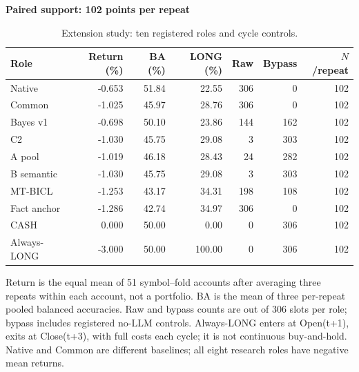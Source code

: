 \begin{table}[!htb]
\centering\small
\setlength{\tabcolsep}{3pt}
\renewcommand{\arraystretch}{1.12}
\caption{Extension study: ten registered roles and cycle controls.}
\label{tab:u09-comparison}
\textbf{Paired support: 102 points per repeat}\par\smallskip
\begin{tabular}{lrrrrrr}
\hline
Role & Return (\%) & BA (\%) & LONG (\%) & Raw & Bypass & $N$/repeat \\
\hline
Native & -0.653 & 51.84 & 22.55 & 306 & 0 & 102 \\
Common & -1.025 & 45.97 & 28.76 & 306 & 0 & 102 \\
Bayes v1 & -0.698 & 50.10 & 23.86 & 144 & 162 & 102 \\
C2 & -1.030 & 45.75 & 29.08 & 3 & 303 & 102 \\
A pool & -1.019 & 46.18 & 28.43 & 24 & 282 & 102 \\
B semantic & -1.030 & 45.75 & 29.08 & 3 & 303 & 102 \\
MT-BICL & -1.253 & 43.17 & 34.31 & 198 & 108 & 102 \\
Fact anchor & -1.286 & 42.74 & 34.97 & 306 & 0 & 102 \\
CASH & 0.000 & 50.00 & 0.00 & 0 & 306 & 102 \\
Always-LONG & -3.000 & 50.00 & 100.00 & 0 & 306 & 102 \\
\hline
\end{tabular}\par\medskip
\begin{minipage}{\textwidth}\footnotesize Return is the equal mean of 51 symbol--fold accounts after averaging three repeats within each account, not a portfolio. BA is the mean of three per-repeat pooled balanced accuracies. Raw and bypass counts are out of 306 slots per role; bypass includes registered no-LLM controls. Always-LONG enters at Open(t+1), exits at Close(t+3), with full costs each cycle; it is not continuous buy-and-hold. Native and Common are different baselines; all eight research roles have negative mean returns.\end{minipage}
\end{table}
